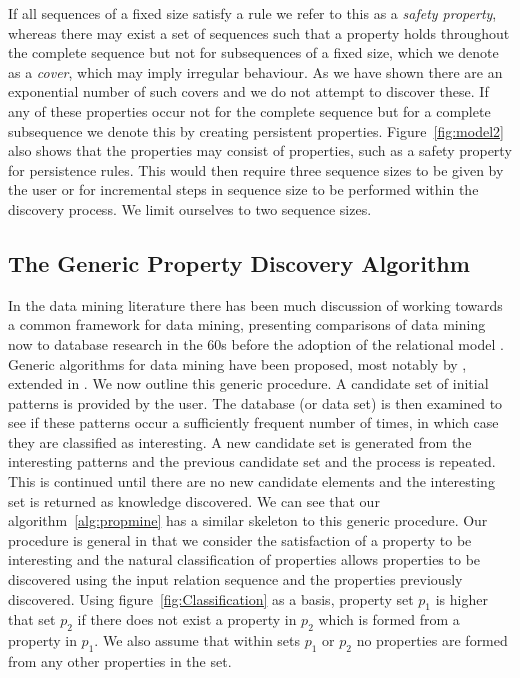 \medskip

If all sequences of a
fixed size satisfy a rule we refer to this as a {\em safety property},
whereas there may exist a set of sequences such that a property holds
throughout the complete sequence but not for subsequences of a fixed
size, which we denote as a {\em cover}, which may imply irregular
behaviour. As we have shown there are an exponential number of such
covers and we do not attempt to discover these. 
If any of these properties occur not for the complete sequence but for
a complete subsequence we
denote this by creating persistent 
properties. Figure~\ref{fig:model2} also shows that the properties may
consist of properties, such as a safety property for persistence
rules. This would then require three sequence sizes to be given by the
user or for incremental steps in sequence size to be performed within
the discovery process. We limit ourselves to two sequence sizes.



\subsection{The Generic Property Discovery Algorithm}\label{subsec:tr_genalg}

In the data mining literature there has been much discussion of
working towards a common framework for data mining, presenting
comparisons of data mining now to database research in the 60s before
the adoption of the relational model \cite{fps96b,man96}. Generic algorithms for data
mining have been proposed, most notably by \cite{man96},
extended in \cite{man97}. We now outline this generic procedure. A
candidate set of initial patterns is provided by the user. The
database (or data set) is then examined to see if these patterns occur
a sufficiently frequent number of times, in which case they are
classified as interesting. A new candidate set is generated from the
interesting patterns and the previous candidate set and the process is
repeated. This is continued until there are no new candidate elements
and the interesting set is returned as knowledge discovered. We can
see that our algorithm~\ref{alg:propmine} has a similar skeleton to
this generic procedure. Our procedure is general in that we consider
the satisfaction of a property to be interesting and the natural
classification of properties allows properties to be discovered using
the input relation sequence and the properties previously discovered. 
Using figure~\ref{fig:Classification} as a basis, property set $p_1$ is higher that set $p_2$ if there does not exist a property
in $p_2$ which is formed from a property in $p_1$. We also assume that
within sets $p_1$ or $p_2$ no properties are formed from any other
properties in the set. 
 
